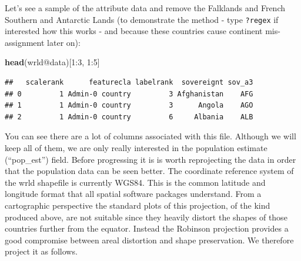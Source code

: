 \documentclass[]{article}
\newenvironment{Shaded}{}{}
\newcommand{\KeywordTok}[1]{\textcolor[rgb]{0.00,0.44,0.13}{\textbf{{#1}}}}
\newcommand{\DecValTok}[1]{\textcolor[rgb]{0.25,0.63,0.44}{{#1}}}
\newcommand{\StringTok}[1]{\textcolor[rgb]{0.25,0.44,0.63}{{#1}}}
\newcommand{\NormalTok}[1]{{#1}}
\begin{document}
Let's see a sample of the attribute data and remove the Falklands and
French Southern and Antarctic Lands (to demonstrate the method - type
\texttt{?regex} if interested how this works - and because these
countries cause continent mis-assignment later on):

\begin{Shaded}
\begin{Highlighting}[]
\KeywordTok{head}\NormalTok{(wrld@data)[}\DecValTok{1}\NormalTok{:}\DecValTok{3}\NormalTok{, }\DecValTok{1}\NormalTok{:}\DecValTok{5}\NormalTok{]}
\end{Highlighting}
\end{Shaded}
\begin{verbatim}
##   scalerank      featurecla labelrank  sovereignt sov_a3
## 0         1 Admin-0 country         3 Afghanistan    AFG
## 1         1 Admin-0 country         3      Angola    AGO
## 2         1 Admin-0 country         6     Albania    ALB
\end{verbatim}
\begin{Shaded}
\end{Shaded}
You can see there are a lot of columns associated with this file.
Although we will keep all of them, we are only really interested in the
population estimate (``pop\_est'') field. Before progressing it is is
worth reprojecting the data in order that the population data can be
seen better. The coordinate reference system of the wrld shapefile is
currently WGS84. This is the common latitude and longitude format that
all spatial software packages understand. From a cartographic
perspective the standard plots of this projection, of the kind produced
above, are not suitable since they heavily distort the shapes of those
countries further from the equator. Instead the Robinson projection
provides a good compromise between areal distortion and shape
preservation. We therefore project it as follows.
\end{document}
